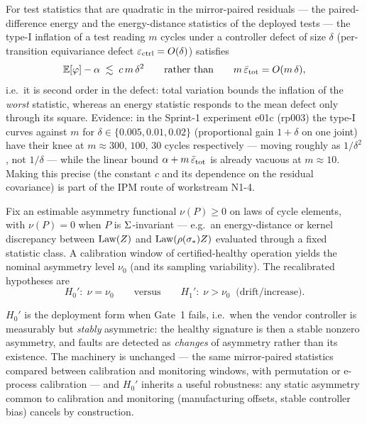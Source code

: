 \begin{conjecture}
\label{conj:quadratic}
For test statistics that are quadratic in the mirror-paired residuals --- the
paired-difference energy and the energy-distance statistics of the deployed
tests --- the type-I inflation of a test reading $m$ cycles under a controller
defect of size $\delta$ (per-transition equivariance defect
$\varepsilon_{\mathrm{ctrl}} = O(\delta)$) satisfies
\[
  \mathbb{E}[\varphi] - \alpha \;\lesssim\; c\, m\, \delta^{2}
  \qquad\text{rather than}\qquad m\,\bar\varepsilon_{\mathrm{tot}} = O(m\,\delta),
\]
i.e.\ it is second order in the defect: total variation bounds the inflation of
the \emph{worst} statistic, whereas an energy statistic responds to the mean
defect only through its square. Evidence: in the Sprint-1 experiment e01c
(rp003) the type-I curves against $m$ for $\delta \in \{0.005, 0.01, 0.02\}$
(proportional gain $1+\delta$ on one joint) have their knee at
$m \approx 300$, $100$, $30$ cycles respectively --- moving roughly as
$1/\delta^{2}$, not $1/\delta$ --- while the linear bound
$\alpha + m\,\bar\varepsilon_{\mathrm{tot}}$ is already vacuous at $m \approx 10$. Making this
precise (the constant $c$ and its dependence on the residual covariance) is
part of the IPM route of workstream N1-4.
\end{conjecture}

\begin{definition}
\label{def:h0prime}
Fix an estimable asymmetry functional $\nu(P) \ge 0$ on laws of cycle
elements, with $\nu(P) = 0$ when $P$ is $\Sigma$-invariant --- e.g.\ an
energy-distance or kernel discrepancy between $\operatorname{Law}(Z)$ and
$\operatorname{Law}(\rho(\sigma_*) Z)$ evaluated through a fixed statistic class. A
calibration window of certified-healthy operation yields the nominal
asymmetry level $\nu_0$ (and its sampling variability). The recalibrated
hypotheses are
\[
  H_0' :\; \nu = \nu_0
  \qquad \text{versus} \qquad
  H_1' :\; \nu > \nu_0 \;\; \text{(drift/increase)} .
\]
\end{definition}

$H_0'$ is the deployment form when Gate~1 fails, i.e.\ when the vendor
controller is measurably but \emph{stably} asymmetric: the healthy signature
is then a stable nonzero asymmetry, and faults are detected as \emph{changes}
of asymmetry rather than its existence. The machinery is unchanged --- the
same mirror-paired statistics compared between calibration and monitoring
windows, with permutation or e-process calibration
\cite{perezortiz2024estatistics} --- and $H_0'$ inherits a useful robustness:
any static asymmetry common to calibration and monitoring (manufacturing
offsets, stable controller bias) cancels by construction.

